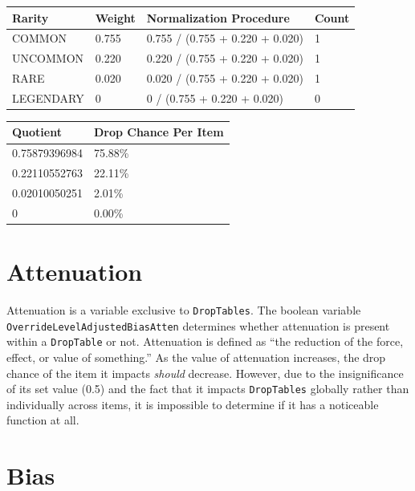 \documentclass[12pt]{article}
\begin{document}
\begin{center}
	\begin{tabular}{|l||l|l|l|}
		\hline
		Rarity    & Weight & Normalization Procedure         & Count \\
		\hline
		COMMON    & 0.755  & 0.755 / (0.755 + 0.220 + 0.020) & 1     \\
		UNCOMMON  & 0.220  & 0.220 / (0.755 + 0.220 + 0.020) & 1     \\
		RARE      & 0.020  & 0.020 / (0.755 + 0.220 + 0.020) & 1     \\
		LEGENDARY & 0      & 0 / (0.755 + 0.220 + 0.020)     & 0     \\ 
		\hline
	\end{tabular}
\end{center}

\begin{center}
	\begin{tabular}{|l||l|}
		\hline
		Quotient      & Drop Chance Per Item \\
		\hline
		0.75879396984 & 75.88\%              \\
		0.22110552763 & 22.11\%              \\
		0.02010050251 & 2.01\%               \\
		0             & 0.00\%               \\ 
		\hline
	\end{tabular}
\end{center}

\section{Attenuation}

Attenuation is a variable exclusive to \texttt{DropTables}. The boolean variable \texttt{OverrideLevelAdjustedBiasAtten} determines whether attenuation is present within a \texttt{DropTable} or not. Attenuation is defined as “the reduction of the force, effect, or value of something.” As the value of attenuation increases, the drop chance of the item it impacts \textit{should} decrease. However, due to the insignificance of its set value (0.5) and the fact that it impacts \texttt{DropTables} globally rather than individually across items, it is impossible to determine if it has a noticeable function at all.

\section{Bias}
\end{document}
